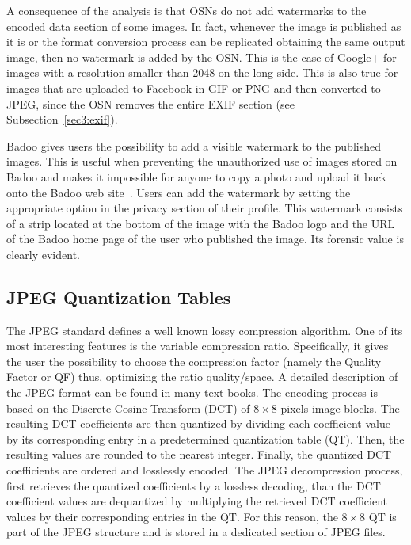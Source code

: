 \documentclass[10pt, conference]{IEEEtran}
\begin{document}
A consequence of the analysis is that OSNs do not add watermarks to the encoded data section of some images.
In fact, whenever the image is published as it is or the format conversion process can be replicated obtaining the same output image, then no watermark is added by the OSN. This is the case of Google+ for images with a resolution smaller than 2048 on the long side.
This is also true for images that are uploaded to Facebook in GIF or PNG and then converted to JPEG, since the OSN removes the entire EXIF section (see Subsection~\ref{sec3:exif}).

Badoo gives users the possibility to add a visible watermark to the published images. This is useful when preventing the unauthorized use of images stored on Badoo and makes it impossible for anyone to copy a photo and upload it back onto the Badoo web site~\cite{badoohelp}. 
Users can add the watermark by setting the appropriate option in the privacy section of their profile.  This watermark consists of a strip located at the bottom of the image with the Badoo logo and the URL of the Badoo home page of the user who published the image. Its forensic value is clearly evident.

\subsection{JPEG Quantization Tables}
\label{sec3:jpeg}
The JPEG standard defines a well known lossy compression algorithm. One of its most interesting features is the variable compression ratio. 
Specifically, it gives the user the possibility to choose the compression factor (namely the Quality Factor or QF) thus, optimizing the ratio quality/space.
A detailed description of the JPEG format can be found in many text books. The encoding process is based on the Discrete Cosine Transform (DCT) of $8 \times 8$ pixels image blocks. The resulting DCT coefficients are then quantized by dividing each coefficient value by its corresponding entry in a predetermined quantization table (QT). Then, the resulting values are rounded to the nearest integer. Finally, the quantized DCT coefficients are ordered and losslessly encoded.
The JPEG decompression process, first retrieves the quantized coefficients by a lossless decoding, than the DCT coefficient values are dequantized by multiplying the retrieved DCT coefficient values by their corresponding entries in the QT. For this reason, the $8 \times 8$ QT is part of the JPEG structure and is stored in a dedicated section of JPEG files.
\end{document}
